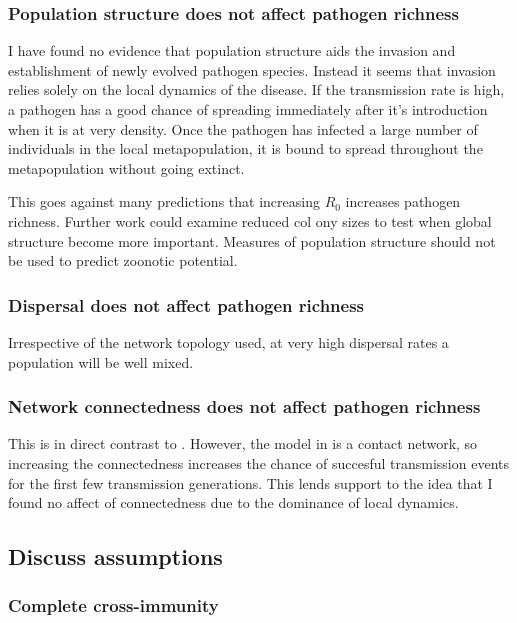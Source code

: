 \subsubsection{Population structure does not affect pathogen richness}

I have found no evidence that population structure aids the invasion and establishment of newly evolved pathogen species.
Instead it seems that invasion relies solely on the local dynamics of the disease.
If the transmission rate is high, a pathogen has a good chance of spreading immediately after it's introduction when it is at very density.
Once the pathogen has infected a large number of individuals in the local metapopulation, it is bound to spread throughout the metapopulation without going extinct.

This goes against many predictions that increasing $R_0$ increases pathogen richness.
Further work could examine reduced col  ony sizes to test when global structure become more important.
Measures of population structure should not be used to predict zoonotic potential.

\subsubsection{Dispersal does not affect pathogen richness}

Irrespective of the network topology used, at very high dispersal rates a population will be well mixed.


\subsubsection{Network connectedness does not affect pathogen richness}

This is in direct contrast to \cite{campos2006pathogen}. 
However, the model in \cite{campos2006pathogen} is a contact network, so increasing the connectedness increases the chance of succesful transmission events for the first few transmission generations.
This lends support to the idea that I found no affect of connectedness due to the dominance of local dynamics.
 


\subsection{Discuss assumptions}

\subsubsection{Complete cross-immunity}

